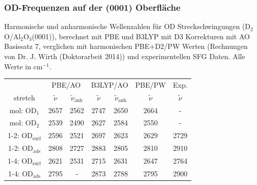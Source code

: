 \documentclass[hyperref={pdfpagelabels=false}]{beamer}
\begin{document}
\begin{frame}[noframenumbering]
\frametitle{OD-Frequenzen auf der (0001) Oberfläche}
Harmonische und anharmonische Wellenzahlen für OD Streckschwingungen (D$_2$O/Al$_2$O$_3$(0001)), berechnet mit PBE und B3LYP mit D3 Korrekturen mit AO Basissatz 7, verglichen mit harmonischen PBE+D2/PW Werten (Rechnungen von Dr. J. Wirth (Doktorarbeit 2014)) und experimentellen SFG Daten. Alle Werte in cm$^{-1}$.
\begin{table}[!h]
  \centering
  \begin{tabular}{ccc|cc|c|c}
  \toprule
   & \multicolumn{2}{c}{PBE/AO} & \multicolumn{2}{c}{B3LYP/AO} &PBE/PW&Exp.\\
  stretch & $\tilde{\nu}$ &$\tilde{\nu}_\textrm{anh}$  &$\tilde{\nu}$ & $\tilde{\nu}_\textrm{anh}$& $\tilde{\nu}$ & $\tilde{\nu}$ \\\midrule
  mol: OD$_{\textrm{1}}$    &2657 &2562 &2747 &2650 & 2664&-\\
  mol: OD$_{\textrm{2}}$    &2539 &2490 &2627 &2584 & 2550&-\\
  1-2: OD$_{\textrm{surf}}$ &2596 &2521 &2697 &2623 & 2629&2729\\%
  1-2: OD$_{\textrm{ads}}$  &2808 &2727 &2883 &2805 & 2810&2910\\%
  1-4: OD$_{\textrm{surf}}$ &2621 &2531 &2715 &2631 & 2647&2764\\%
  1-4: OD$_{\textrm{ads}}$  &2795 &- &2873 &2788 & 2795&2900\\%
  \bottomrule
    \end{tabular}
\end{table}
\end{frame}
\end{document}
